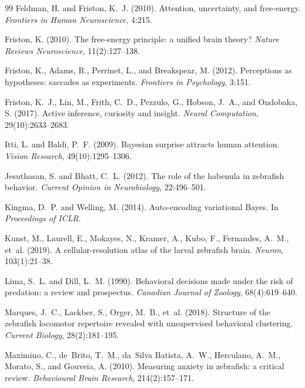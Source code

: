 \documentclass[12pt]{article}
\begin{document}
\begin{thebibliography}{99}
Feldman, H. and Friston, K.~J. (2010).
Attention, uncertainty, and free-energy.
\textit{Frontiers in Human Neuroscience}, 4:215.

Friston, K. (2010).
The free-energy principle: a unified brain theory?
\textit{Nature Reviews Neuroscience}, 11(2):127--138.

Friston, K., Adams, R., Perrinet, L., and Breakspear, M. (2012).
Perceptions as hypotheses: saccades as experiments.
\textit{Frontiers in Psychology}, 3:151.

Friston, K.~J., Lin, M., Frith, C.~D., Pezzulo, G., Hobson, J.~A., and Ondobaka, S. (2017).
Active inference, curiosity and insight.
\textit{Neural Computation}, 29(10):2633--2683.

Itti, L. and Baldi, P.~F. (2009).
Bayesian surprise attracts human attention.
\textit{Vision Research}, 49(10):1295--1306.

Jesuthasan, S. and Bhatt, C.~L. (2012).
The role of the habenula in zebrafish behavior.
\textit{Current Opinion in Neurobiology}, 22:496--501.

Kingma, D.~P. and Welling, M. (2014).
Auto-encoding variational {B}ayes.
In \textit{Proceedings of ICLR}.

Kunst, M., Laurell, E., Mokayes, N., Kramer, A., Kubo, F., Fernandes, A.~M., et~al. (2019).
A cellular-resolution atlas of the larval zebrafish brain.
\textit{Neuron}, 103(1):21--38.

Lima, S.~L. and Dill, L.~M. (1990).
Behavioral decisions made under the risk of predation: a review and prospectus.
\textit{Canadian Journal of Zoology}, 68(4):619--640.

Marques, J.~C., Lackber, S., Orger, M.~B., et~al. (2018).
Structure of the zebrafish locomotor repertoire revealed with unsupervised behavioral clustering.
\textit{Current Biology}, 28(2):181--195.

Maximino, C., de~Brito, T.~M., da~Silva Batista, A.~W., Herculano, A.~M., Morato, S., and Gouveia, A. (2010).
Measuring anxiety in zebrafish: a critical review.
\textit{Behavioural Brain Research}, 214(2):157--171.


\end{thebibliography}
\end{document}
